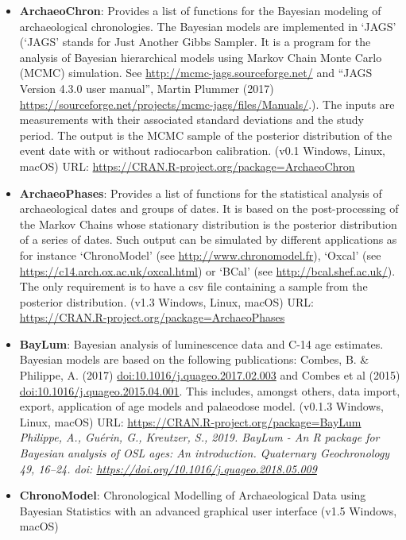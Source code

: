\documentclass[]{article}
\providecommand{\tightlist}{%
  \setlength{\itemsep}{0pt}\setlength{\parskip}{0pt}}
\begin{document}
\begin{itemize}
\tightlist
\item
  \textbf{ArchaeoChron}: Provides a list of functions for the Bayesian modeling of archaeological chronologies. The Bayesian models are implemented in `JAGS' (`JAGS' stands for Just Another Gibbs Sampler. It is a program for the analysis of Bayesian hierarchical models using Markov Chain Monte Carlo (MCMC) simulation. See \url{http://mcmc-jags.sourceforge.net/} and ``JAGS Version 4.3.0 user manual'', Martin Plummer (2017) \url{https://sourceforge.net/projects/mcmc-jags/files/Manuals/}.). The inputs are measurements with their associated standard deviations and the study period. The output is the MCMC sample of the posterior distribution of the event date with or without radiocarbon calibration.
  (v0.1 \textbar{} Windows, Linux, macOS)
  URL: \url{https://CRAN.R-project.org/package=ArchaeoChron}
\item
  \textbf{ArchaeoPhases}: Provides a list of functions for the statistical analysis of archaeological dates and groups of dates. It is based on the post-processing of the Markov Chains whose stationary distribution is the posterior distribution of a series of dates. Such output can be simulated by different applications as for instance `ChronoModel' (see \url{http://www.chronomodel.fr}), `Oxcal' (see \url{https://c14.arch.ox.ac.uk/oxcal.html}) or `BCal' (see \url{http://bcal.shef.ac.uk/}). The only requirement is to have a csv file containing a sample from the posterior distribution.
  (v1.3 \textbar{} Windows, Linux, macOS)
  URL: \url{https://CRAN.R-project.org/package=ArchaeoPhases}
\item
  \textbf{BayLum}: Bayesian analysis of luminescence data and C-14 age estimates. Bayesian models are based on the following publications: Combes, B. \& Philippe, A. (2017) \url{doi:10.1016/j.quageo.2017.02.003} and Combes et al (2015) \url{doi:10.1016/j.quageo.2015.04.001}. This includes, amongst others, data import, export, application of age models and palaeodose model.
  (v0.1.3 \textbar{} Windows, Linux, macOS)
  URL: \url{https://CRAN.R-project.org/package=BayLum}
  \emph{Philippe, A., Guérin, G., Kreutzer, S., 2019. BayLum - An R package for Bayesian analysis of OSL ages: An introduction. Quaternary Geochronology 49, 16--24. doi: \url{https://doi.org/10.1016/j.quageo.2018.05.009}}
\item
  \textbf{ChronoModel}: Chronological Modelling of Archaeological Data using Bayesian Statistics with an advanced graphical user interface
  (v1.5 \textbar{} Windows, macOS)

\end{itemize}
\end{document}

